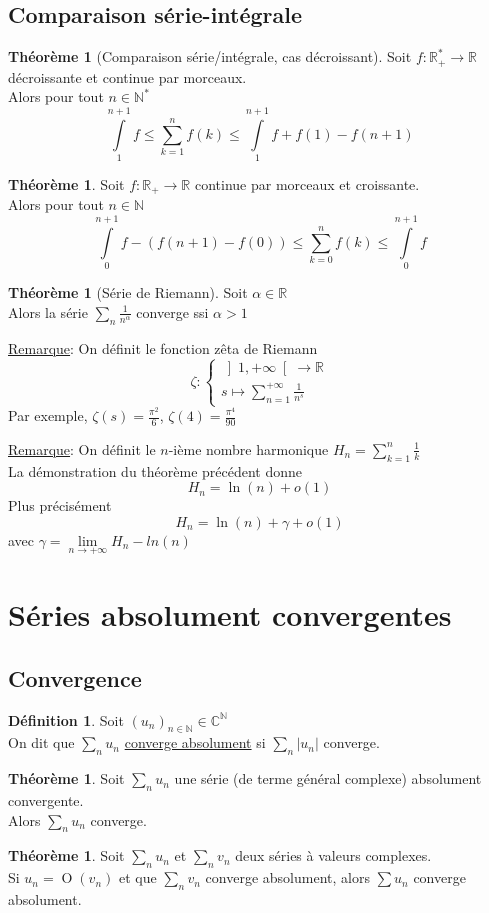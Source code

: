 \documentclass[10pt,a4paper]{article}
\theoremstyle{definition}
\newtheorem{theorem}[proposition]{Théorème}
\newtheorem{definition}[proposition]{Définition}
\DeclareMathOperator*{\dom}{O}
\begin{document}
\subsection{Comparaison série-intégrale}
\begin{theorem}[Comparaison série/intégrale, cas décroissant]
Soit $f: \mathbb{R}_+^* \to \mathbb{R}$ décroissante et continue par morceaux. \\
Alors pour tout $n \in \mathbb{N}^*$
\[\int\limits_1^{n + 1}f \leq \sum_{k = 1}^n f(k) \leq \int\limits_1^{n + 1}f + f(1) - f(n+1)\]
\end{theorem}
\begin{theorem}
Soit $f: \mathbb{R}_+ \to \mathbb{R}$ continue par morceaux et croissante. \\
Alors pour tout $n \in \mathbb{N}$
\[\int\limits_{0}^{n + 1} f - ( f(n + 1) - f(0)) \leq \sum_{k = 0}^n f(k) \leq \int\limits_{0}^{n + 1} f\]
\end{theorem}
\begin{theorem}[Série de Riemann]
Soit $\alpha \in \mathbb{R}$ \\
Alors la série $\sum\limits_n \frac{1}{n^\alpha}$ converge ssi $\alpha > 1$
\end{theorem}
\noindent \uline{Remarque}: On définit le fonction zêta de Riemann
\[ \zeta: \begin{cases}
\left] 1, +\infty \right[ \to \mathbb{R} \\
s \mapsto \sum\limits_{n = 1}^{+\infty} \frac{1}{n^s}
\end{cases} \]
Par exemple, $\zeta(s) = \frac{\pi^2}{6}$, $\zeta(4) = \frac{\pi^4}{90}$ \medskip

\noindent \uline{Remarque}: On définit le $n$-ième nombre harmonique $H_n = \sum\limits_{k = 1}^n \frac{1}{k}$ \\
La démonstration du théorème précédent donne
\[ H_n = \ln(n) + o(1)\]
Plus précisément
\[ H_n = \ln(n) + \gamma + o(1)\]
avec $\gamma = \lim\limits_{n \to +\infty} H_n - ln(n)$

\section{Séries absolument convergentes}
\subsection{Convergence}
\begin{definition}
Soit $(u_n)_{n \in \mathbb{N}} \in \mathbb{C}^\mathbb{N}$ \\
On dit que $\sum\limits_n u_n$ \uline{converge absolument} si $\sum\limits_n |u_n|$ converge.
\end{definition}
\begin{theorem}
Soit $\sum\limits_n u_n$ une série (de terme général complexe) absolument convergente. \\
Alors $\sum\limits_n u_n$ converge.
\end{theorem}
\begin{theorem}
Soit $\sum\limits_n u_n$ et $\sum\limits_n v_n$ deux séries à valeurs complexes. \\
Si $u_n = \dom(v_n)$ et que $\sum\limits_n v_n$ converge absolument, alors $\sum u_n$ converge absolument.
\end{theorem}
\end{document}
